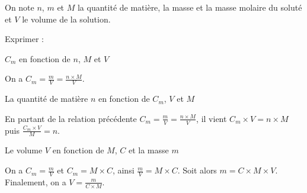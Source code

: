 On note $n$, $m$ et $M$ la quantité de matière, la masse et la masse molaire du soluté et $V$ le volume de la solution. 

Exprimer : 


\begin{enonce}
$C_m$ en fonction de $n$, $M$ et $V$
\end{enonce}


\begin{corrige}
On a $C_m=\frac{m}{V}=\frac{n\times M}{V}$.
\end{corrige}




\begin{enonce}
La quantité de matière $n$ en fonction de $C_m$, $V$ et $M$
\end{enonce}


\begin{corrige}
En partant de la relation précédente $C_m=\frac{m}{V}=\frac{n\times M}{V}$, il vient $C_m\times V=n\times M$ puis $\frac{C_m\times V}{M}=n$.
\end{corrige}




\begin{enonce}
Le volume $V$ en fonction de $M$, $C$ et la masse $m$
\end{enonce}


\begin{corrige}
On a $C_m=\frac{m}{V}$ et $C_m=M\times C$, ainsi $\frac{m}{V}=M\times C$. Soit alors $m=C\times M\times V$. Finalement, on a $V=\frac{m}{C\times M}$.
\end{corrige}


\finEntrainement





